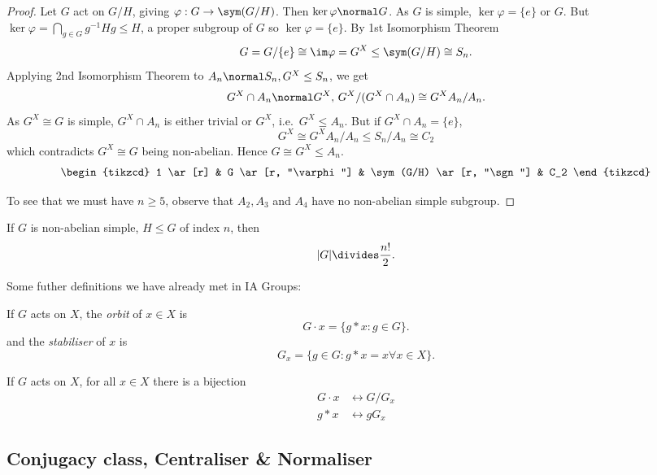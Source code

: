 \documentclass[a4paper]{article}
\theoremstyle{definition}
\begin{document}
\begin{proof}
  Let \(G\) act on \(G/H\), giving \(\varphi: G \to \sym(G/H)\). Then \(\ker \varphi \normal G\). As \(G\) is simple, \(\ker \varphi = \{e\}\) or \(G\). But \(\ker \varphi = \bigcap_{g \in G} g^{-1}Hg \leq H\), a proper subgroup of \(G\) so \(\ker \varphi = \{e\}\). By 1st Isomorphism Theorem
  \[
    G = G/\{e\} \cong \im \varphi = G^X \leq \sym(G/H) \cong S_n.
  \]
  Applying 2nd Isomorphism Theorem to \(A_n \normal S_n, G^X \leq S_n\), we get
  \[
    G^X \cap A_n \normal G^X, \, G^X/(G^X \cap A_n) \cong G^XA_n/A_n.
  \]
  As \(G^X \cong G\) is simple, \(G^X \cap A_n\) is either trivial or \(G^X\), i.e.\ \(G^X \leq A_n\). But if \(G^X \cap A_n = \{e\}\),
  \[
    G^X \cong G^XA_n/A_n \leq S_n/A_n \cong C_2
  \]
  which contradicts \(G^X \cong G\) being non-abelian. Hence \(G \cong G^X \leq A_n\).
  \[
    \begin{tikzcd}
      1 \ar[r] & G \ar[r, "\varphi"] & \sym(G/H) \ar[r, "\sgn"] & C_2
    \end{tikzcd}
  \]
  
  To see that we must have \(n \geq 5\), observe that \(A_2, A_3\) and \(A_4\) have no non-abelian simple subgroup.
\end{proof}

\begin{corollary}
  If \(G\) is non-abelian simple, \(H \leq G\) of index \(n\), then
  \[
    |G| \divides \frac{n!}{2}.
  \]
\end{corollary}

Some futher definitions we have already met in IA Groups:

\begin{definition}
  If \(G\) acts on \(X\), the \emph{orbit} of \(x \in X\) is
  \[
    G \cdot x = \{g * x: g \in G\}.
  \]
  and the \emph{stabiliser} of \(x\) is
  \[
    G_x = \{g \in G: g * x = x \forall x \in X\}.
  \]
\end{definition}

\begin{theorem}
  \label{thm:orbit-stabiliser}
  If \(G\) acts on \(X\), for all \(x \in X\) there is a bijection
  \begin{align*}
    G \cdot x &\leftrightarrow G/G_x \\
    g * x &\leftrightarrow gG_x
  \end{align*}
\end{theorem}

\subsection{Conjugacy class, Centraliser \& Normaliser}
\end{document}
